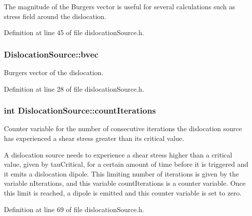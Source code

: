 \-The magnitude of the \-Burgers vector is useful for several calculations such as stress field around the dislocation. 

\-Definition at line 45 of file dislocation\-Source.\-h.

\hypertarget{classDislocationSource_ade4753ac6106317c693c2bba4f83a568}{
\subsubsection[{bvec}]{ {\bf \-Dislocation\-Source\-::bvec}}}\label{de/de3/classDislocationSource_ade4753ac6106317c693c2bba4f83a568}


\-Burgers vector of the dislocation. 



\-Definition at line 28 of file dislocation\-Source.\-h.

\hypertarget{classDislocationSource_ac566b877a7c43922077af29bba597a93}{
\subsubsection[{count\-Iterations}]{\setlength{\rightskip}{0pt plus 5cm}int {\bf \-Dislocation\-Source\-::count\-Iterations}}}\label{de/de3/classDislocationSource_ac566b877a7c43922077af29bba597a93}


\-Counter variable for the number of consecutive iterations the dislocation source has experienced a shear stress greater than its critical value. 

\-A dislocation source needs to experience a shear stress higher than a critical value, given by tau\-Critical, for a certain amount of time before it is triggered and it emits a dislocation dipole. \-This limiting number of iterations is given by the variable n\-Iterations, and this variable count\-Iterations is a counter variable. \-Once this limit is reached, a dipole is emitted and this counter variable is set to zero. 

\-Definition at line 69 of file dislocation\-Source.\-h.

